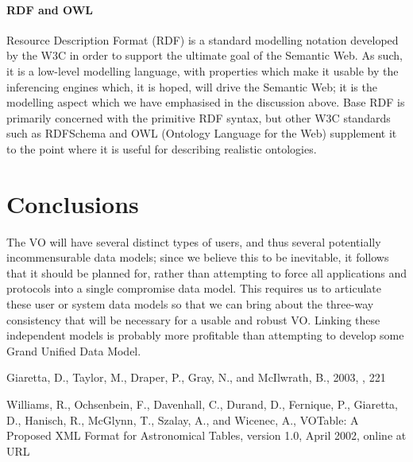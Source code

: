 \documentclass[11pt,twoside]{article}
\begin{document}
\paragraph{RDF and OWL}

Resource Description Format (RDF) is a standard modelling notation
developed by the W3C in order to support the ultimate goal of the
Semantic Web.  As such, it is a low-level modelling language, with
properties which make it usable by the inferencing engines which, it is
hoped, will drive the Semantic Web; it is the modelling aspect which we
have emphasised in the discussion above.  Base RDF is primarily concerned
with the primitive RDF syntax, but other W3C standards such as RDFSchema
and OWL (Ontology Language for the Web) supplement it to the point
where it is useful for describing realistic ontologies.


\section{Conclusions}

The VO will have several distinct types of users, and thus several
potentially incommensurable data models; since we believe this to be
inevitable, it follows that it should be planned for, rather than
attempting to force all applications and protocols into a single
compromise data model.  This requires us to articulate these user or
system data models so that we can bring about the three-way consistency
that will be necessary for a usable and robust VO.  Linking these
independent models is probably more profitable than attempting to develop
some Grand Unified Data Model.




\begin{references}
Giaretta, D., %
Taylor, M., %
Draper, P., %
Gray, N., %
and
McIlwrath, B., %
2003,
\adassxii,
221

Williams, R., %
Ochsenbein, F., %
Davenhall, C., %
Durand, D., %
Fernique, P., %
Giaretta, D., %
Hanisch, R., %
McGlynn, T., %
Szalay, A., %
and
Wicenec, A., %
VOTable: A Proposed XML Format for Astronomical Tables, version 1.0,
April 2002,
online at URL 

\end{references}
\end{document}
